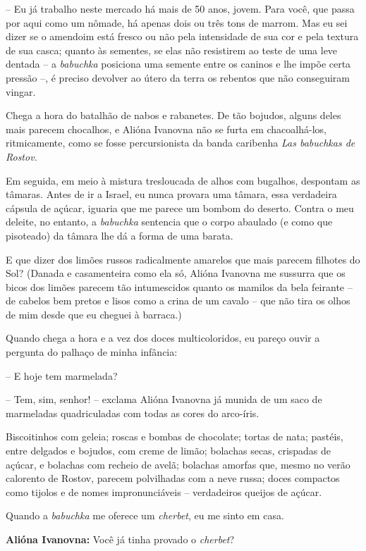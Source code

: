 -- Eu já trabalho neste mercado há mais de 50 anos, jovem. Para você,
que passa por aqui como um nômade, há apenas dois ou três tons de
marrom. Mas eu sei dizer se o amendoim está fresco ou não pela
intensidade de sua cor e pela textura de sua casca; quanto às sementes,
se elas não resistirem ao teste de uma leve dentada -- a \emph{babuchka}
posiciona uma semente entre os caninos e lhe impõe certa pressão --, é
preciso devolver ao útero da terra os rebentos que não conseguiram
vingar.

Chega a hora do batalhão de nabos e rabanetes. De tão bojudos, alguns
deles mais parecem chocalhos, e Alióna Ivanovna não se furta em
chacoalhá-los, ritmicamente, como se fosse percursionista da banda
caribenha \emph{Las babuchkas de Rostov. }

Em seguida, em meio à mistura tresloucada de alhos com bugalhos,
despontam as tâmaras. Antes de ir a Israel, eu nunca provara uma tâmara,
essa verdadeira cápsula de açúcar, iguaria que me parece um bombom do
deserto. Contra o meu deleite, no entanto, a \emph{babuchka} sentencia
que o corpo abaulado (e como que pisoteado) da tâmara lhe dá a forma de
uma barata.

E que dizer dos limões russos radicalmente amarelos que mais parecem
filhotes do Sol? (Danada e casamenteira como ela só, Alióna Ivanovna me
sussurra que os bicos dos limões parecem tão intumescidos quanto os
mamilos da bela feirante -- de cabelos bem pretos e lisos como a crina
de um cavalo -- que não tira os olhos de mim desde que eu cheguei à
barraca.)

Quando chega a hora e a vez dos doces multicoloridos, eu pareço ouvir a
pergunta do palhaço de minha infância:

-- E hoje tem marmelada?

-- Tem, sim, senhor! -- exclama Alióna Ivanovna já munida de um saco de
marmeladas quadriculadas com todas as cores do arco-íris.

Biscoitinhos com geleia; roscas e bombas de chocolate; tortas de nata;
pastéis, entre delgados e bojudos, com creme de limão; bolachas secas,
crispadas de açúcar, e bolachas com recheio de avelã; bolachas amorfas
que, mesmo no verão calorento de Rostov, parecem polvilhadas com a neve
russa; doces compactos como tijolos e de nomes impronunciáveis --
verdadeiros queijos de açúcar.

Quando a \emph{babuchka} me oferece um \emph{cherbet}, eu me sinto em
casa.

\textbf{Alióna Ivanovna:} Você já tinha provado o \emph{cherbet}?

